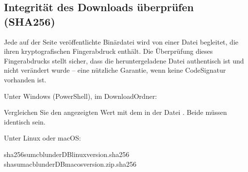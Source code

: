 \documentclass[letterpaper,10pt,german]{sphinxmanual}
\begin{document}
\begin{figure}[htbp]
\centering

\noindent{}
\end{figure}

\begin{figure}[htbp]
\centering

\noindent{}
\end{figure}

\begin{figure}[htbp]
\centering

\noindent{}
\end{figure}


\subsection{Integrität des Downloads überprüfen (SHA256)}
\label{\detokenize{annexe_windows_securite:verifier-l-integrite-du-telechargement-sha256}}
\sphinxAtStartPar
Jede auf der Seite  veröffentlichte Binärdatei wird von einer \sphinxhyphen{}Datei begleitet, die ihren kryptografischen Fingerabdruck enthält. Die Überprüfung dieses Fingerabdrucks stellt sicher, dass die heruntergeladene Datei authentisch ist und nicht verändert wurde – eine nützliche Garantie, wenn keine Code\sphinxhyphen{}Signatur vorhanden ist.

\sphinxAtStartPar
Unter Windows (PowerShell), im Download\sphinxhyphen{}Ordner:

\begin{sphinxVerbatim}[commandchars=\\\{\}]
   
\end{sphinxVerbatim}

\sphinxAtStartPar
Vergleichen Sie den angezeigten Wert mit dem in der Datei . Beide müssen identisch sein.

\sphinxAtStartPar
Unter Linux oder macOS:

\begin{sphinxVerbatim}[commandchars=\\\{\}]
sha256sum\PYGZhy{}cblunderDB\PYGZhy{}linux\PYGZhy{}\PYGZlt{}version\PYGZgt{}.sha256
shasum\PYGZhy{}a\PYGZhy{}cblunderDB\PYGZhy{}macos\PYGZhy{}\PYGZlt{}version\PYGZgt{}.zip.sha256
\end{sphinxVerbatim}
\end{document}
